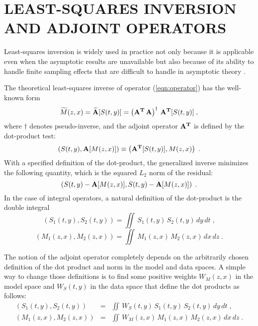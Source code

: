 
\section{LEAST-SQUARES INVERSION AND ADJOINT OPERATORS}
Least-squares inversion is widely used in practice not only because it
  is applicable even when the asymptotic results are unavailable but also
  because of its ability to handle finite sampling effects that are 
  difficult to handle in asymptotic theory \cite[]{GEO65-05-13641371}.

The theoretical least-squares inverse of operator (\ref{eqn:operator}) has the
well-known form \cite[]{tarantola}
\begin{equation}
\widetilde{M}(z,x)={\bf \widetilde{A}}[S(t,y)]=
{\bf \left(A^{T}\,A\right)^{\dagger}\,A^{T}}[S(t,y)]\;,
\label{eqn:LS}
\end{equation} 
where $\dagger$ denotes pseudo-inverse, and 
the adjoint operator ${\bf A^{T}}$ is defined by the dot-product
test:
\begin{equation}
\left(S(t,y),{\bf A}[M(z,x)]\right) \equiv 
\left({\bf A^{T}}[S(t,y)],M(z,x)\right)\;.
\label{eqn:dottest}
\end{equation}
With a specified definition of the dot-product, the generalized
inverse minimizes the following quantity, which is the squared $L_2$
norm of the residual:
\begin{equation}
\left(S(t,y)-{\bf A}[M(z,x)],
S(t,y)-{\bf A}[M(z,x)]\right)\;.
\end{equation}
In the case of integral operators, a natural definition of the dot-product
is the double integral
\begin{equation}
\left(S_1(t,y),S_2(t,y)\right)  = 
\iint\,S_1(t,y)\,S_2(t,y)\,dy\,dt\;,
\end{equation}
\begin{equation}
\left(M_1(z,x),M_2(z,x)\right)  = 
\iint\,M_1(z,x)\,M_2(z,x)\,dx\,dz\;.
\end{equation}
\par
The notion of the adjoint operator completely depends on the
arbitrarily chosen definition of the dot product and norm in the model
and data spaces. A simple way to change those definitions is to find
some positive weights $W_M(z,x)$ in the model space and $W_S(t,y)$ in
the data space that define the dot products as follows:
\begin{eqnarray}
\left(S_1(t,y),S_2(t,y)\right) & = &
\iint\,W_S(t,y)\,S_1(t,y)\,S_2(t,y)\,dy\,dt\;,
\label{eqn:wsproduct} \\
\left(M_1(z,x),M_2(z,x)\right) & = &
\iint\,W_M(z,x)\,M_1(z,x)\,M_2(z,x)\,dx\,dz\;.
\label{eqn:wmproduct}
\end{eqnarray}
